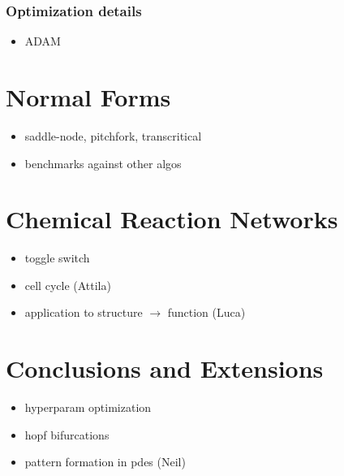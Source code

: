 \subsubsection{Optimization details}

\begin{itemize}
    \item ADAM
\end{itemize}

\section{Normal Forms}
\label{sec:normal-forms}

\begin{itemize}
    \item saddle-node, pitchfork, transcritical
    \item benchmarks against other algos
\end{itemize}


\section{Chemical Reaction Networks}
\label{sec:networks}

\begin{itemize}
    \item toggle switch
    \item cell cycle (Attila)
    \item application to structure $\rightarrow$ function (Luca)
\end{itemize}

\section{Conclusions and Extensions}
\label{sec:conclusions}

\begin{itemize}
    \item hyperparam optimization
    \item hopf bifurcations
    \item pattern formation in pdes (Neil)
\end{itemize}





